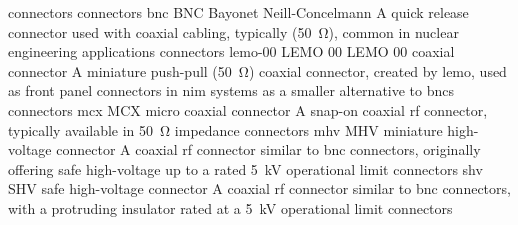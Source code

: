 \newglsXterm%
{connectors}%
{connectors}%
{\nopostdesc}%
\newglsXacronym%
{bnc}%
{BNC}%
{Bayonet Neill{\--}Concelmann}%
{A quick release  connector used with coaxial cabling, typically (\SI{50}{\ohm}), common in nuclear engineering applications}%
{connectors}%
\newglsXacronym%
{lemo-00}%
{LEMO 00}%
{LEMO 00 coaxial connector}%
{A miniature push-pull (\SI{50}{\ohm}) coaxial connector, created by \gls{lemo}, used as front panel connectors in \gls{nim} systems as a smaller alternative to \glspl{bnc}}%
{connectors}%
\newglsXacronym%
{mcx}%
{MCX}%
{micro coaxial connector}%
{A snap-on coaxial \gls{rf} connector, typically available in \SI{50}{\ohm} impedance}%
{connectors}%
\newglsXacronym%
{mhv}%
{MHV}%
{miniature high{\--}voltage connector}%
{A coaxial \gls{rf} connector similar to \gls{bnc} connectors, originally offering safe \gls{high-voltage} up to a rated \SI{5}{\kilo\volt} operational limit}%
{connectors}%
\newglsXacronym%
{shv}%
{SHV}%
{safe high{\--}voltage connector}%
{A coaxial \gls{rf} connector similar to \gls{bnc} connectors, with a protruding insulator rated at a \SI{5}{\kilo\volt} operational limit}%
{connectors}%
